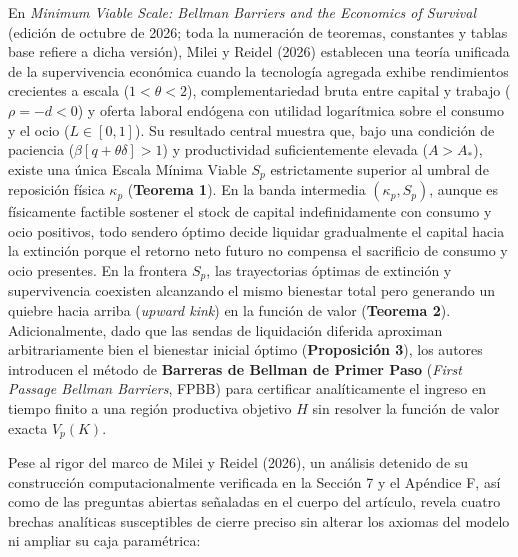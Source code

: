 \documentclass[11pt,letterpaper]{article}
\theoremstyle{plain}
\begin{document}
En \emph{Minimum Viable Scale: Bellman Barriers and the Economics of Survival} (edición de octubre de 2026; toda la numeración de teoremas, constantes y tablas base refiere a dicha versión), Milei y Reidel (2026) establecen una teoría unificada de la supervivencia económica cuando la tecnología agregada exhibe rendimientos crecientes a escala ($1<\theta<2$), complementariedad bruta entre capital y trabajo ($\rho=-d<0$) y oferta laboral endógena con utilidad logarítmica sobre el consumo y el ocio ($L\in[0,1]$). Su resultado central muestra que, bajo una condición de paciencia ($\beta[q+\theta\delta]>1$) y productividad suficientemente elevada ($A>A_*$), existe una única Escala Mínima Viable $S_p$ estrictamente superior al umbral de reposición física $\kappa_p$ (\textbf{Teorema 1}). En la banda intermedia $(\kappa_p,S_p)$, aunque es físicamente factible sostener el stock de capital indefinidamente con consumo y ocio positivos, todo sendero óptimo decide liquidar gradualmente el capital hacia la extinción porque el retorno neto futuro no compensa el sacrificio de consumo y ocio presentes. En la frontera $S_p$, las trayectorias óptimas de extinción y supervivencia coexisten alcanzando el mismo bienestar total pero generando un quiebre hacia arriba (\emph{upward kink}) en la función de valor (\textbf{Teorema 2}). Adicionalmente, dado que las sendas de liquidación diferida aproximan arbitrariamente bien el bienestar inicial óptimo (\textbf{Proposición 3}), los autores introducen el método de \textbf{Barreras de Bellman de Primer Paso} (\emph{First Passage Bellman Barriers}, FPBB) para certificar analíticamente el ingreso en tiempo finito a una región productiva objetivo $H$ sin resolver la función de valor exacta $V_p(K)$.

Pese al rigor del marco de Milei y Reidel (2026), un análisis detenido de su construcción computacionalmente verificada en la Sección 7 y el Apéndice F, así como de las preguntas abiertas señaladas en el cuerpo del artículo, revela cuatro brechas analíticas susceptibles de cierre preciso sin alterar los axiomas del modelo ni ampliar su caja paramétrica:
\end{document}
